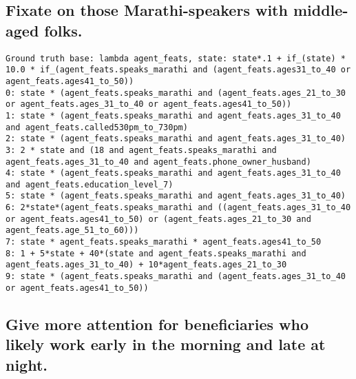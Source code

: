 \subsection{Fixate on those Marathi-speakers with middle-aged folks.}


\begin{lstlisting}
Ground truth base: lambda agent_feats, state: state*.1 + if_(state) * 10.0 * if_(agent_feats.speaks_marathi and (agent_feats.ages31_to_40 or agent_feats.ages41_to_50))
0: state * (agent_feats.speaks_marathi and (agent_feats.ages_21_to_30 or agent_feats.ages_31_to_40 or agent_feats.ages41_to_50)) 
1: state * (agent_feats.speaks_marathi and agent_feats.ages_31_to_40 and agent_feats.called530pm_to_730pm) 
2: state * (agent_feats.speaks_marathi and agent_feats.ages_31_to_40) 
3: 2 * state and (18 and agent_feats.speaks_marathi and agent_feats.ages_31_to_40 and agent_feats.phone_owner_husband) 
4: state * (agent_feats.speaks_marathi and agent_feats.ages_31_to_40 and agent_feats.education_level_7) 
5: state * (agent_feats.speaks_marathi and agent_feats.ages_31_to_40) 
6: 2*state*(agent_feats.speaks_marathi and ((agent_feats.ages_31_to_40 or agent_feats.ages41_to_50) or (agent_feats.ages_21_to_30 and agent_feats.age_51_to_60))) 
7: state * agent_feats.speaks_marathi * agent_feats.ages41_to_50 
8: 1 + 5*state + 40*(state and agent_feats.speaks_marathi and agent_feats.ages_31_to_40) + 10*agent_feats.ages_21_to_30 
9: state * (agent_feats.speaks_marathi and (agent_feats.ages_31_to_40 or agent_feats.ages41_to_50)) 

\end{lstlisting}
\subsection{Give more attention for beneficiaries who likely work early in the morning and late at night.}


